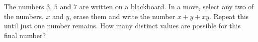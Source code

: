 The numbers $3$, $5$ and $7$ are written on a blackboard. In a move, select any two of the numbers, $x$ and $y$, erase them and write the number $x+y+xy$. Repeat this until just one number remains. How many distinct values are possible for this final number?
